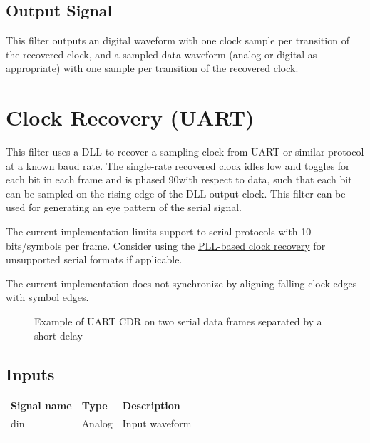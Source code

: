 \subsection{Output Signal}

This filter outputs an digital waveform with one clock sample per transition of the recovered clock, and a sampled data
waveform (analog or digital as appropriate) with one sample per transition of the recovered clock.

\pagebreak
\section{Clock Recovery (UART)}
\label{filter:cdruart}

This filter uses a DLL to recover a sampling clock from UART or similar protocol at a known baud rate. The single-rate
recovered clock idles low and toggles for each bit in each frame and is phased 90\textdegree with respect to data, such
that each bit can be sampled on the rising edge of the DLL output clock. This filter can be used for generating an eye
pattern of the serial signal.

The current implementation limits support to serial protocols with 10 bits/symbols per frame. Consider using the
\hyperref[filter:cdrpll]{PLL-based clock recovery} for unsupported serial formats if applicable.

The current implementation does not synchronize by aligning falling clock edges with symbol edges.

\begin{figure}[h]
\centering
{}
\caption{Example of UART CDR on two serial data frames separated by a short delay}
\label{filter_cdruart}
\end{figure}

\subsection{Inputs}

\begin{tabularx}{16cm}{llX}
\thickhline
\textbf{Signal name} & \textbf{Type} & \textbf{Description} \\
\thickhline
din & Analog & Input waveform \\
\thickhline
\end{tabularx}

